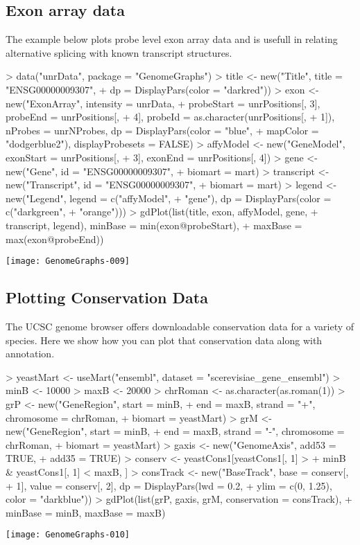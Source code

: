 \documentclass[11pt]{article}
\begin{document}
\subsection{Exon array data}

The example below plots probe level exon array data and is usefull in
relating alternative splicing with known transcript structures.

\begin{Schunk}
\begin{Sinput}
> data("unrData", package = "GenomeGraphs")
> title <- new("Title", title = "ENSG00000009307", 
+     dp = DisplayPars(color = "darkred"))
> exon <- new("ExonArray", intensity = unrData, 
+     probeStart = unrPositions[, 3], probeEnd = unrPositions[, 
+         4], probeId = as.character(unrPositions[, 
+         1]), nProbes = unrNProbes, dp = DisplayPars(color = "blue", 
+         mapColor = "dodgerblue2"), displayProbesets = FALSE)
> affyModel <- new("GeneModel", exonStart = unrPositions[, 
+     3], exonEnd = unrPositions[, 4])
> gene <- new("Gene", id = "ENSG00000009307", 
+     biomart = mart)
> transcript <- new("Transcript", id = "ENSG00000009307", 
+     biomart = mart)
> legend <- new("Legend", legend = c("affyModel", 
+     "gene"), dp = DisplayPars(color = c("darkgreen", 
+     "orange")))
> gdPlot(list(title, exon, affyModel, gene, 
+     transcript, legend), minBase = min(exon@probeStart), 
+     maxBase = max(exon@probeEnd))
\end{Sinput}
\end{Schunk}
\texttt{[image: GenomeGraphs-009]}

\subsection{Plotting Conservation Data}
The UCSC genome browser offers downloadable conservation data for a
variety of species. Here we show how you can plot that conservation
data along with annotation. 

\begin{Schunk}
\begin{Sinput}
> yeastMart <- useMart("ensembl", dataset = "scerevisiae_gene_ensembl")
> minB <- 10000
> maxB <- 20000
> chrRoman <- as.character(as.roman(1))
> grP <- new("GeneRegion", start = minB, 
+     end = maxB, strand = "+", chromosome = chrRoman, 
+     biomart = yeastMart)
> grM <- new("GeneRegion", start = minB, 
+     end = maxB, strand = "-", chromosome = chrRoman, 
+     biomart = yeastMart)
> gaxis <- new("GenomeAxis", add53 = TRUE, 
+     add35 = TRUE)
> conserv <- yeastCons1[yeastCons1[, 1] > 
+     minB & yeastCons1[, 1] < maxB, ]
> consTrack <- new("BaseTrack", base = conserv[, 
+     1], value = conserv[, 2], dp = DisplayPars(lwd = 0.2, 
+     ylim = c(0, 1.25), color = "darkblue"))
> gdPlot(list(grP, gaxis, grM, conservation = consTrack), 
+     minBase = minB, maxBase = maxB)
\end{Sinput}
\end{Schunk}
\texttt{[image: GenomeGraphs-010]}
\end{document}
